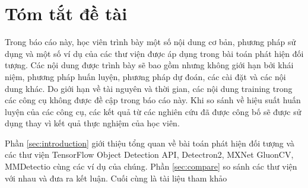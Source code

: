 \section{Tóm tắt đề tài}
\label{summary}

Trong báo cáo này, học viên trình bày một số nội dung cơ bản, phương pháp sử dụng và một số ví dụ của các thư viện được áp dụng trong bài toán phát hiện đối tượng. Các nội dung được trình bày sẽ bao gồm nhưng không giới hạn bởi khái niệm, phương pháp huấn luyện, phương pháp dự đoán, các cài đặt và các nội dung khác. Do giới hạn về tài nguyên và thời gian, các nội dung training trong các công cụ không được đề cập trong báo cáo này. Khi so sánh về hiệu suất huấn luyện của các công cụ, các kết quả từ các nghiên cứu đã được công bố sẽ được sử dụng thay vì kết quả thực nghiệm của học viên.

Phần \ref{sec:introduction} giới thiệu tổng quan về bài toán phát hiện đối tượng và các thư viện TensorFlow Object Detection API, Detectron2, MXNet GluonCV, MMDetectio cùng các ví dụ của chúng. Phần \ref{sec:compare} so sánh các thư viện với nhau và đưa ra kết luận. Cuối cùng là tài liệu tham khảo
